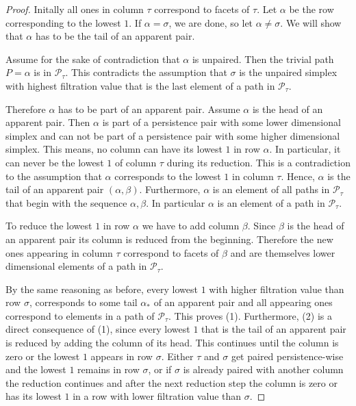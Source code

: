 \begin{proof}
Initally all ones in column $\tau$ correspond to facets of $\tau$. Let $\alpha$ be the row corresponding to the lowest $1$. If $\alpha = \sigma$, we are done, so let $\alpha \neq \sigma$.
We will show that $\alpha$ has to be the tail of an apparent pair. 

Assume for the sake of contradiction that $\alpha$ is unpaired. Then the trivial path $P = \alpha$ is in $\mathcal{P}_\tau$. This contradicts the assumption that $\sigma$ is the unpaired simplex with highest filtration value that is the last element of a path in $\mathcal{P}_\tau$. 

Therefore $\alpha$ has to be part of an apparent pair. Assume $\alpha$ is the head of an apparent pair. Then $\alpha$ is part of a persistence pair with some lower dimensional simplex and can not be part of a persistence pair with some higher dimensional simplex. This means, no column can have its lowest $1$ in row $\alpha$. In particular, it can never be the lowest $1$ of column $\tau$ during its reduction. This is a contradiction to the assumption that $\alpha$ corresponds to the lowest $1$ in column $\tau$. Hence, $\alpha$ is the tail of an apparent pair $(\alpha, \beta)$. Furthermore, $\alpha$ is an element of all paths in $\mathcal{P}_\tau$ that begin with the sequence $\alpha,\beta$. In particular $\alpha$ is an element of a path in $\mathcal{P}_\tau$.

To reduce the lowest $1$ in row $\alpha$ we have to add column $\beta$. Since $\beta$ is the head of an apparent pair its column is reduced from the beginning. Therefore the new ones appearing in column $\tau$ correspond to facets of $\beta$ and are themselves lower dimensional elements of a path in $\mathcal{P}_\tau$. 

By the same reasoning as before, every lowest $1$ with higher filtration value than row $\sigma$, corresponds to some tail $\alpha_*$ of an apparent pair and all appearing ones correspond to elements in a path of $\mathcal{P}_\tau$. This proves (1). Furthermore, (2) is a direct consequence of (1), since every lowest $1$ that is the tail of an apparent pair is reduced by adding the column of its head. This continues until the column is zero or the lowest $1$ appears in row $\sigma$. Either $\tau$ and $\sigma$ get paired persistence-wise and the lowest $1$ remains in row $\sigma$, or if $\sigma$ is already paired with another column the reduction continues and after the next reduction step the column is zero or has its lowest $1$ in a row with lower filtration value than $\sigma$.
\end{proof}

